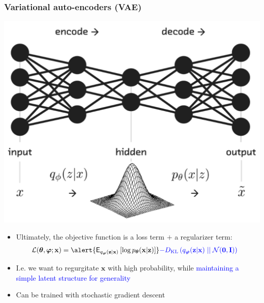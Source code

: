 \documentclass[mathserif,compress]{beamer}
\newcommand*\ba{\[ \begin{aligned}}
\newcommand*\ea{\end{aligned} \]}
\newcommand*\Esub[2]{\mathsf{E}_{#1}\left[#2\right]}
\renewcommand\;{\,}
\renewcommand\phi{\varphi}
\begin{document}
\begin{frame}\frametitle{Variational auto-encoders (VAE)}
\begin{center}
\includegraphics[width=0.8\linewidth]{Images/VAE_NN.png}
\end{center}
\end{frame}

\begin{frame}
\begin{itemize}
\item
Ultimately, the objective function is a loss term $+$ a regularizer term:
\smallskip
\ba
\mathcal L (\boldsymbol \theta, \boldsymbol \phi ; \mathbf x)
	& = \alert{ \Esub{q_{\boldsymbol \phi}(\mathbf z | \mathbf x) }
		{\log p_{\boldsymbol \theta}(\mathbf x | \mathbf z) } }
		 \textcolor{blue}{ - D_\text{KL} \left( 
			q_{\boldsymbol \phi}(\mathbf z | \mathbf x) 
			\mid\mid
			\mathcal N(\mathbf 0, \mathbf I) \right) }
\ea
\smallskip
\item
I.e. we want to \alert{regurgitate $\mathbf x$ with high probability}, while \textcolor{blue}{maintaining a simple latent structure for generality}
\bigskip
\item
Can be trained with stochastic gradient descent
\end{itemize}
\end{frame}
\end{document}
